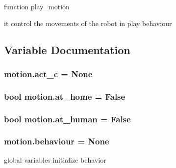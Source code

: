 function play\+\_\+motion 

it control the movements of the robot in play behaviour 

\subsection{Variable Documentation}
\subsubsection[{\texorpdfstring{act\+\_\+c}{act_c}}]{\setlength{\rightskip}{0pt plus 5cm}motion.\+act\+\_\+c = None}\hypertarget{namespacemotion_aba6af569cf57bbdc8a1d01598d29d99b}{}\label{namespacemotion_aba6af569cf57bbdc8a1d01598d29d99b}
\subsubsection[{\texorpdfstring{at\+\_\+home}{at_home}}]{\setlength{\rightskip}{0pt plus 5cm}bool motion.\+at\+\_\+home = False}\hypertarget{namespacemotion_a30e58643e988d1faddb84cdfd54965f8}{}\label{namespacemotion_a30e58643e988d1faddb84cdfd54965f8}
\subsubsection[{\texorpdfstring{at\+\_\+human}{at_human}}]{\setlength{\rightskip}{0pt plus 5cm}bool motion.\+at\+\_\+human = False}\hypertarget{namespacemotion_a8a70e4c3b029440acf94460c95f42841}{}\label{namespacemotion_a8a70e4c3b029440acf94460c95f42841}
\subsubsection[{\texorpdfstring{behaviour}{behaviour}}]{\setlength{\rightskip}{0pt plus 5cm}motion.\+behaviour = None}\hypertarget{namespacemotion_a15d63b2a70ac940f179085ce72871c86}{}\label{namespacemotion_a15d63b2a70ac940f179085ce72871c86}


global variables initialize behavior 

